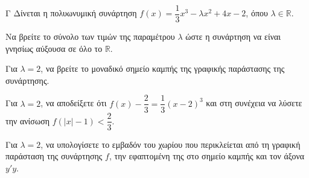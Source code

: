 \begin{thema}{Γ}
Δίνεται η πολυωνυμική συνάρτηση $f(x) = \dfrac{1}{3}x^3 - \lambda x^2 + 4x - 2$, όπου $\lambda \in \mathbb{R}$.
\begin{erwthma}
  \item Να βρείτε το σύνολο των τιμών της παραμέτρου $\lambda$ ώστε η συνάρτηση να είναι γνησίως αύξουσα σε όλο το $\mathbb{R}$.
  \item Για $\lambda = 2$, να βρείτε το μοναδικό σημείο καμπής της γραφικής παράστασης της συνάρτησης.
  \item Για $\lambda = 2$, να αποδείξετε ότι $f(x) - \dfrac{2}{3} = \dfrac{1}{3}(x-2)^3$ και στη συνέχεια να λύσετε την ανίσωση $f(|x| - 1) < \dfrac{2}{3}$.
  \item Για $\lambda = 2$, να υπολογίσετε το εμβαδόν του χωρίου που περικλείεται από τη γραφική παράσταση της συνάρτησης $f$, την εφαπτομένη της στο σημείο καμπής και τον άξονα $y'y$.
\end{erwthma}
\end{thema}
